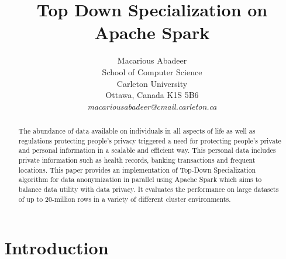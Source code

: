 \documentclass[11pt]{article}       %
\begin{document}


\title{Top Down Specialization on Apache Spark\texttrademark}


\author{
Macarious Abadeer\\
School of Computer Science\\
Carleton University\\
Ottawa, Canada K1S 5B6\\
{\em macariousabadeer@cmail.carleton.ca}
} %

\maketitle

\begin{abstract}
The abundance of data available on individuals in all aspects of life as well as regulations protecting people's privacy triggered a need for protecting people's private and personal information in a scalable and efficient way. This personal data includes private information such as health records, banking transactions and frequent locations. This paper provides an implementation of Top-Down Specialization algorithm for data anonymization in parallel using Apache Spark which aims to balance data utility with data privacy. It evaluates the performance on large datasets of up to 20-million rows in a variety of different cluster environments.
\end{abstract}


\section{Introduction} \label{intro}
\end{document}

